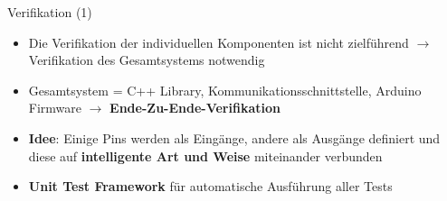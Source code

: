 \documentclass{beamer}
\begin{document}
\begin{frame}{Verifikation (1)}
	\begin{itemize}
		\item Die Verifikation der individuellen Komponenten ist nicht zielf\"uhrend $\rightarrow$ Verifikation des Gesamtsystems notwendig
	\end{itemize}
	\begin{itemize}
		\item Gesamtsystem = C++ Library, Kommunikationsschnittstelle, Arduino Firmware $\rightarrow$ \textbf{Ende-Zu-Ende-Verifikation}
	\end{itemize}
	\begin{itemize}
		\item \textbf{Idee}: Einige Pins werden als Eing\"ange, andere als Ausg\"ange definiert und diese auf \textbf{intelligente Art und Weise} miteinander verbunden
	\end{itemize}
	\begin{itemize}
		\item \textbf{Unit Test Framework} f\"ur automatische Ausf\"uhrung aller Tests
	\end{itemize}
\end{frame}
\end{document}
